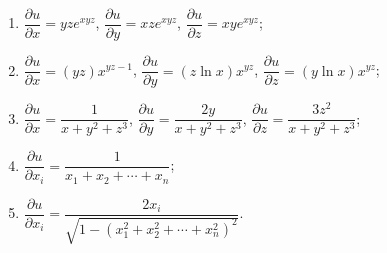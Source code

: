 \begin{enumerate}
\begin{enumerate}[(1)]
            \item %
                $\dfrac{\partial{u}}{\partial{x}}=yze^{xyz}$,
                $\dfrac{\partial{u}}{\partial{y}}=xze^{xyz}$,
                $\dfrac{\partial{u}}{\partial{z}}=xye^{xyz}$;
            \item %
                $\dfrac{\partial{u}}{\partial{x}} = (yz)x^{yz-1}$,
                $\dfrac{\partial{u}}{\partial{y}} = (z\ln{x})x^{yz}$,
                $\dfrac{\partial{u}}{\partial{z}} = (y\ln{x})x^{yz}$;
            \item %
                $\dfrac{\partial{u}}{\partial{x}} = \dfrac{1}{x+y^2+z^3}$,
                $\dfrac{\partial{u}}{\partial{y}} = \dfrac{2y}{x+y^2+z^3}$,
                $\dfrac{\partial{u}}{\partial{z}} = \dfrac{3z^2}{x+y^2+z^3}$;
            \item %
                $\dfrac{\partial{u}}{\partial{x_i}} = \dfrac{1}{x_1 + x_2 + \cdots + x_n}$;
            \item %
                $\dfrac{\partial{u}}{\partial{x_i}} = \dfrac{2x_i}{\sqrt{1 - (x_1^2 + x_2^2 + \cdots + x_n^2)^2}}$.
        \end{enumerate}
\end{enumerate}
% 
